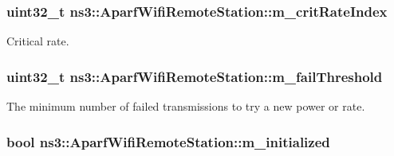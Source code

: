 \subsubsection[{\texorpdfstring{m\+\_\+crit\+Rate\+Index}{m_critRateIndex}}]{\setlength{\rightskip}{0pt plus 5cm}uint32\+\_\+t ns3\+::\+Aparf\+Wifi\+Remote\+Station\+::m\+\_\+crit\+Rate\+Index}\hypertarget{structns3_1_1AparfWifiRemoteStation_a743cf10eded84b1f3387dcfe714722e8}{}\label{structns3_1_1AparfWifiRemoteStation_a743cf10eded84b1f3387dcfe714722e8}


Critical rate. 

\subsubsection[{\texorpdfstring{m\+\_\+fail\+Threshold}{m_failThreshold}}]{\setlength{\rightskip}{0pt plus 5cm}uint32\+\_\+t ns3\+::\+Aparf\+Wifi\+Remote\+Station\+::m\+\_\+fail\+Threshold}\hypertarget{structns3_1_1AparfWifiRemoteStation_a5821ba097d28ec6b7db0101cf52227c5}{}\label{structns3_1_1AparfWifiRemoteStation_a5821ba097d28ec6b7db0101cf52227c5}


The minimum number of failed transmissions to try a new power or rate. 

\subsubsection[{\texorpdfstring{m\+\_\+initialized}{m_initialized}}]{\setlength{\rightskip}{0pt plus 5cm}bool ns3\+::\+Aparf\+Wifi\+Remote\+Station\+::m\+\_\+initialized}\hypertarget{structns3_1_1AparfWifiRemoteStation_a9cbccd234cad4347b7424a0a7784fd5e}{}\label{structns3_1_1AparfWifiRemoteStation_a9cbccd234cad4347b7424a0a7784fd5e}


